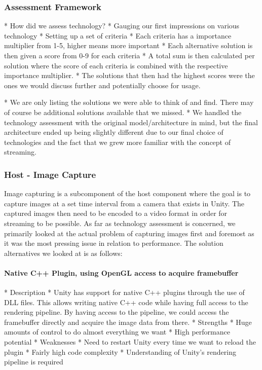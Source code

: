 \subsubsection{Assessment Framework}
* How did we assess technology?
    * Gauging our first impressions on various technology
    * Setting up a set of criteria
    * Each criteria has a importance multiplier from 1-5, higher means more important
    * Each alternative solution is then given a score from 0-9 for each criteria
    * A total sum is then calculated per solution where the score of each criteria is combined with the respective importance multiplier. 
    * The solutions that then had the highest scores were the ones we would discuss further and potentially choose for usage.

* We are only listing the solutions we were able to think of and find. There may of course be additional solutions available that we missed. 
* We handled the technology assessment with the original model/architecture in mind, but the final architecture ended up being slightly different due to our final choice of technologies and the fact that we grew more familiar with the concept of streaming. 

\subsubsection{Host - Image Capture} %
Image capturing is a subcomponent of the host component where the goal is to capture images at a set time interval from a camera that exists in Unity. The captured images then need to be encoded to a video format in order for streaming to be possible. As far as technology assessment is concerned, we primarily looked at the actual problem of capturing images first and foremost as it was the most pressing issue in relation to performance. The solution alternatives we looked at is as follows:
\paragraph{Native C++ Plugin, using OpenGL access to acquire framebuffer}
        * Description
            * Unity has support for native C++ plugins through the use of DLL files. This allows writing native C++ code while having full access to the rendering pipeline. By having access to the pipeline, we could access the framebuffer directly and acquire the image data from there.   
        * Strengths
            * Huge amounts of control to do almost everything we want 
            * High performance potential
        * Weaknesses
            * Need to restart Unity every time we want to reload the plugin
            * Fairly high code complexity
            * Understanding of Unity's rendering pipeline is required
